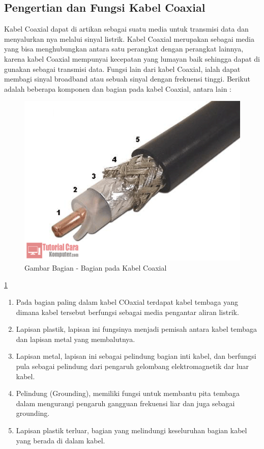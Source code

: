 \begin{itemize}
\begin{itemize}
	\subsection{Pengertian dan Fungsi Kabel Coaxial}
	Kabel Coaxial dapat di artikan sebagai suatu media untuk transmisi data dan menyalurkan nya melalui sinyal listrik. Kabel Coaxial merupakan sebagai media yang bisa menghubungkan antara satu perangkat dengan perangkat lainnya, karena kabel Coaxial mempunyai kecepatan yang lumayan baik sehingga dapat di gunakan sebagai transmisi data. Fungsi lain dari kabel Coaxial, ialah dapat membagi sinyal broadband atau sebuah sinyal dengan frekuensi tinggi. Berikut adalah beberapa komponen dan bagian pada kabel Coaxial, antara lain :
	\begin{figure} [ht]
	\centerline{\includegraphics[width=1\textwidth]{figures/bgncoax.png}}
	\caption{Gambar Bagian - Bagian pada Kabel Coaxial}
	\label{bgncoax}
	\end{figure}
	
	\ref{bgncoax}
		\begin{enumerate}
			\item Pada bagian paling dalam kabel COaxial terdapat kabel tembaga yang dimana kabel tersebut berfungsi sebagai media pengantar aliran listrik.
			\item Lapisan plastik, lapisan ini fungsinya menjadi pemisah antara kabel tembaga dan lapisan metal yang membalutnya.
			\item Lapisan metal, lapisan ini sebagai pelindung bagian inti kabel, dan berfungsi pula sebagai pelindung dari pengaruh gelombang elektromagnetik dar luar kabel.
			\item Pelindung (Grounding), memiliki fungsi untuk membantu pita tembaga dalam mengurangi pengaruh gangguan frekuensi liar dan juga sebagai grounding.
			\item Lapisan plastik terluar, bagian yang melindungi keseluruhan bagian kabel yang berada di dalam kabel.
		\end{enumerate}
		

\end{itemize}
\end{itemize}
